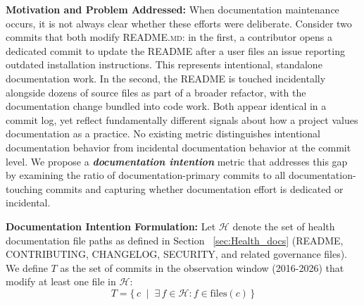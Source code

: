 \documentclass[10pt,conference]{IEEEtran}
\begin{document}
{%

\textbf{Motivation and Problem Addressed:}
When documentation maintenance occurs, it is not always clear whether these efforts were deliberate. 
Consider two commits that both modify \textsc{README.md}: in the first, a contributor opens a dedicated commit to update the \textsc{README} after a user files an issue reporting outdated installation instructions. 
This represents intentional, standalone documentation work. 
In the second, the \textsc{README} is touched incidentally alongside dozens of source files as part of a broader refactor, with the documentation change bundled into code work. 
Both appear identical in a commit log, yet reflect fundamentally different signals about how a project values documentation as a practice.
No existing metric distinguishes intentional documentation behavior from incidental documentation behavior at the commit level.
We propose a \textit{\textbf{documentation intention}} metric that  addresses this gap by examining the ratio of documentation-primary commits to all documentation-touching commits and capturing whether documentation effort is dedicated or incidental.


\noindent \textbf{ Documentation Intention Formulation:}
\label{sec:document_intention_formulation}
Let $\mathcal{H}$ denote the set of health documentation 
file paths as defined in Section ~\ref{sec:Health_docs} 
(README, CONTRIBUTING, CHANGELOG, SECURITY, and 
related governance files). We define $T$ as the set 
of commits in the observation window (2016-2026) that modify at 
least one file in $\mathcal{H}$:
\vspace{-8pt}
\[
  T = \bigl\{\, c \;\mid\; 
  \exists\, f \in \mathcal{H} : f \in \text{files}(c) 
  \,\bigr\}
\]

}
\end{document}
